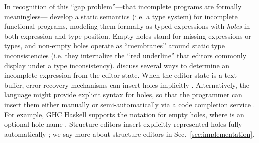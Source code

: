 
In recognition of this ``{gap problem}''---that incomplete programs are formally meaningless---\citet{popl-paper} develop a static semantics (i.e. a type system) for incomplete 
functional programs, modeling them formally as typed expressions with \emph{holes} in 
both expression and type position. 
Empty holes stand for missing expressions or types,
and non-empty holes operate as ``membranes'' around static type inconsistencies 
(i.e. they internalize the ``red underline'' that editors commonly display under a type inconsistency).
\citet{popl-paper,HazelnutSNAPL} discuss several ways to determine an incomplete expression from the editor state. When the editor state is a text buffer, error recovery mechanisms can insert holes implicitly \cite{DBLP:journals/siamcomp/AhoP72,charles1991practical,graham1979practical,DBLP:conf/oopsla/KatsJNV09}. Alternatively, the language might provide explicit syntax for holes, so that the programmer can insert them either manually  
or semi-automatically via a code completion service \cite{Amorim2016}. For example, GHC Haskell supports the notation  for empty holes, where  is an optional hole name \cite{GHCHoles}. Structure editors insert explicitly represented holes fully automatically \cite{popl-paper}; we say more about structure editors in Sec.~\ref{sec:implementation}.

